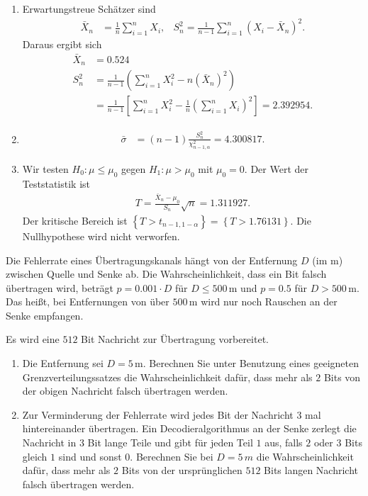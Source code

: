 \solution
\begin{enumerate}
    \item Erwartungstreue Schätzer sind
        \begin{align*}
            \bar X_n &= \frac{1}{n} \sum_{i=1}^{n} X_i, & S^2_n = \frac{1}{n-1} \sum_{i=1}^{n} \left( X_i - \bar X_n \right)^2.
        \end{align*}
        Daraus ergibt sich
        \begin{align*}
            \bar X_n &= 0.524  \\
            S^2_n &= \frac{1}{n-1} \left( \sum_{i=1}^{n} X_i^2 - n \left( \bar X_n \right)^2 \right) \\
            &= \frac{1}{n-1} \left[  \sum_{i=1}^{n} X_i^{2 } - \frac{1}{n} \left( \sum_{i=1}^{n} X_i \right)^2 \right] = 2.392954. 
        \end{align*}
    \item
        \begin{align*}
            \bar \sigma &= (n-1) \frac{S^2_n}{\chi^{2}_{n-1, \alpha}} = 4.300817. 
        \end{align*}
    \item Wir testen $H_0: \mu \leq \mu_0$ gegen $H_1: \mu>\mu_0$ mit
        $\mu_0=0$. Der Wert der Teststatistik ist
        \begin{align*}
            T = \frac{\bar X_n - \mu_0}{S_n} \sqrt{n} = 1.311927. 
        \end{align*}
        Der kritische Bereich ist $\left\{ T > t_{n-1, 1-\alpha}\right\}=
        \left\{ T > 1.76131 \right\}$. Die Nullhypothese wird nicht verworfen.
\end{enumerate}



 Die Fehlerrate eines Übertragungskanals hängt
von der Entfernung $D$ (im m) zwischen Quelle und Senke ab. Die
Wahrscheinlichkeit, dass ein Bit falsch übertragen wird, beträgt $p =
0.001\cdot{} D$ für $D\leq 500\,\text{m}$ und $p=0.5$ für $D>500\,\text{m}$.
Das heißt, bei Entfernungen von über $500\,\text{m}$ wird nur noch Rauschen an
der Senke empfangen.

Es wird eine $512$ Bit Nachricht zur Übertragung vorbereitet.  
\begin{enumerate}
    \item Die Entfernung sei $D=5\,$m. Berechnen Sie unter Benutzung eines
        geeigneten Grenzverteilungssatzes die Wahrscheinlichkeit dafür, dass
        mehr als $2$ Bits von der obigen Nachricht falsch übertragen werden. 

    \item Zur Verminderung der Fehlerrate wird jedes Bit der Nachricht $3$ mal
        hintereinander übertragen. Ein Decodieralgorithmus an der Senke zerlegt
        die Nachricht in $3$ Bit lange Teile und gibt für jeden Teil $1$ aus,
        falls $2$ oder $3$ Bits gleich $1$ sind und sonst $0$. Berechnen Sie
        bei $D=5\,m$ die Wahrscheinlichkeit dafür, dass mehr als $2$ Bits
        von der ursprünglichen $512$ Bits langen Nachricht falsch übertragen
        werden.
\end{enumerate}

